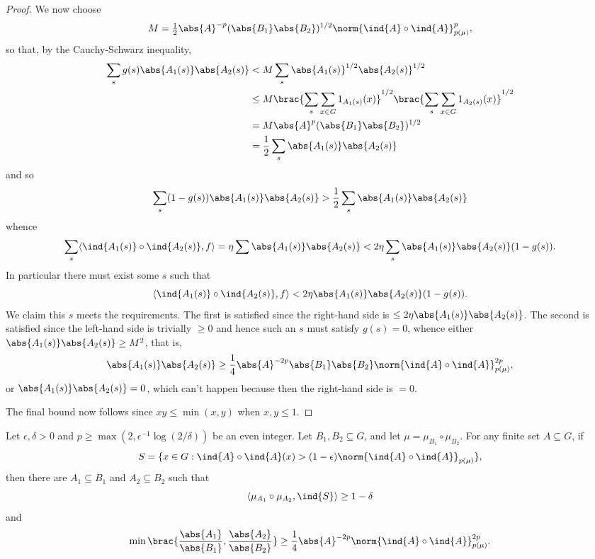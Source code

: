 \begin{proof}
We now choose
\[M=\tfrac{1}{2}\abs{A}^{-p}(\abs{B_1}\abs{B_2})^{1/2}\norm{\ind{A}\circ \ind{A}}_{p(\mu)}^p,\]
so that, by the Cauchy-Schwarz inequality,
\begin{align*}
\sum_s g(s)\abs{A_1(s)}\abs{A_2(s)}
&< M \sum_s \abs{A_1(s)}^{1/2}\abs{A_2(s)}^{1/2}\\
&\leq M\brac{\sum_s \sum_{x\in G}1_{A_1(s)}(x)}^{1/2}\brac{\sum_s \sum_{x\in G}1_{A_2(s)}(x)}^{1/2}\\
&= M\abs{A}^p(\abs{B_1}\abs{B_2})^{1/2}\\
&=\frac{1}{2}\sum_s \abs{A_1(s)}\abs{A_2(s)}
\end{align*}
and so
\[
\sum_s (1-g(s))\abs{A_1(s)}\abs{A_2(s)}
> \frac{1}{2}\sum_s \abs{A_1(s)}\abs{A_2(s)}\]
whence
\[\sum_s\langle \ind{A_1(s)}\circ \ind{A_2(s)},f\rangle =\eta \sum \abs{A_1(s)}\abs{A_2(s)}
< 2\eta \sum_s \abs{A_1(s)}\abs{A_2(s)}(1-g(s)).\]
In particular there must exist some $s$ such that
\[\langle \ind{A_1(s)}\circ \ind{A_2(s)},f\rangle< 2\eta \abs{A_1(s)}\abs{A_2(s)}(1-g(s)).\]
We claim this $s$ meets the requirements. The first is satisfied since the right-hand side is $\leq 2\eta \abs{A_1(s)}\abs{A_2(s)}$. The second is satisfied since the left-hand side is trivially $\geq 0$ and hence such an $s$ must satisfy $g(s)=0$, whence either $ \abs{A_1(s)}\abs{A_2(s)}\geq M^2$, that is,
\[\abs{A_1(s)}\abs{A_2(s)}\geq \frac{1}{4}\abs{A}^{-2p}\abs{B_1}\abs{B_2}\norm{\ind{A}\circ \ind{A}}_{p(\mu)}^{2p},\]
or $\abs{A_1(s)}\abs{A_2(s)}=0$, which can't happen because then the right-hand side is $=0$.

The final bound now follows since $xy \leq \min(x,y)$ when $x,y\leq 1$.
\end{proof}


\begin{lemma}
\label{sift}
\leanok
Let $\epsilon,\delta >0$ and $p\geq \max(2,\epsilon^{-1}\log(2/\delta))$ be an even integer. Let $B_1,B_2\subseteq G$, and let $\mu=\mu_{B_1}\circ\mu_{B_2}$. For any finite set $A\subseteq G$, if
\[S=\{ x\in G: \ind{A}\circ \ind{A}(x)>(1-\epsilon)\norm{\ind{A}\circ \ind{A}}_{p(\mu)}\},\]
then there are $A_1\subseteq B_1$ and $A_2\subseteq B_2$ such that
\[\langle \mu_{A_1}\circ\mu_{A_2},\ind{S}\rangle \geq 1-\delta\]
and
\[\min\brac{\frac{\abs{A_1}}{\abs{B_1}},\frac{\abs{A_2}}{\abs{B_2}}}\geq \frac{1}{4}\abs{A}^{-2p}\norm{\ind{A}\circ \ind{A}}_{p(\mu)}^{2p}.\]
\end{lemma}

